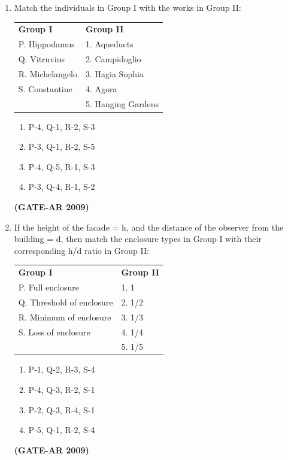 \documentclass[a4paper,10pt]{article}
\begin{document}
\begin{enumerate}
    \item Match the individuals in Group I with the works in Group II:  \\
    \begin{tabular}{ l l }
	\textbf{Group I} & \textbf{Group II} \\
	P. Hippodamus & 1. Aqueducts \\
	Q. Vitruvius & 2. Campidoglio \\
	R. Michelangelo & 3. Hagia Sophia \\
	S. Constantine & 4. Agora \\
	& 5. Hanging Gardens \\
	\end{tabular}
	\begin{multicols}{2}
	\begin{enumerate}
        \item P-4, Q-1, R-2, S-3
        \item P-3, Q-1, R-2, S-5
        \item P-4, Q-5, R-1, S-3
        \item P-3, Q-4, R-1, S-2
    \end{enumerate}
	\end{multicols}
    \hfill \textbf{(GATE-AR 2009)}
    
    \item If the height of the facade = h, and the distance of the observer from the building = d, then match the enclosure types in Group I with their corresponding h/d ratio in Group II:  \\
    \begin{tabular}{ l l }
	\textbf{Group I} & \textbf{Group II} \\
	P. Full enclosure & 1. 1 \\
	Q. Threshold of enclosure & 2. 1/2 \\
	R. Minimum of enclosure & 3. 1/3 \\
	S. Loss of enclosure & 4. 1/4 \\
	& 5. 1/5 \\
	\end{tabular}
	\begin{multicols}{2}
	\begin{enumerate}
        \item P-1, Q-2, R-3, S-4
        \item P-4, Q-3, R-2, S-1
        \item P-2, Q-3, R-4, S-1
        \item P-5, Q-1, R-2, S-4
    \end{enumerate}
	\end{multicols}
    \hfill \textbf{(GATE-AR 2009)}


\end{enumerate}
\end{document}
